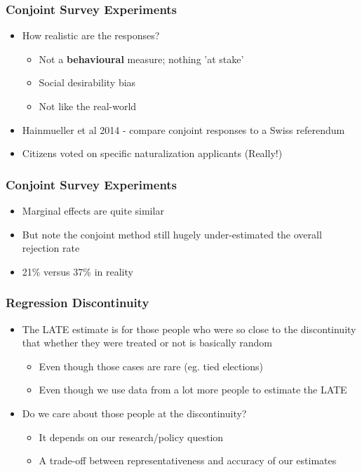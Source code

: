 \documentclass[xcolor=x11names,compress]{beamer}\usepackage[]{graphicx}\usepackage[]{color}
\renewcommand{\(}{\begin{columns}}
\renewcommand{\)}{\end{columns}}
\newcommand{\<}[1]{\begin{column}{#1}}
\renewcommand{\>}{\end{column}}
\begin{document}




\begin{frame}
\frametitle{Conjoint Survey Experiments}
\begin{itemize}
\item How realistic are the responses?
\pause
\begin{itemize}
\item Not a \textbf{behavioural} measure; nothing 'at stake'
\pause
\item Social desirability bias
\pause
\item Not like the real-world
\pause
\end{itemize}
\item Hainmueller et al 2014 - compare conjoint responses to a Swiss referendum
\pause
\item Citizens voted on specific naturalization applicants (Really!)
\end{itemize}
\end{frame}



\begin{frame}
\frametitle{Conjoint Survey Experiments}
\begin{itemize}
\item Marginal effects are quite similar
\pause
\item But note the conjoint method still hugely under-estimated the overall rejection rate
\item 21\% versus 37\% in reality
\end{itemize}
\end{frame}

\begin{frame}
\frametitle{Regression Discontinuity}
\begin{itemize}
\item The LATE estimate is for those people who were so close to the discontinuity that whether they were treated or not is basically random
\pause
\begin{itemize}
\item Even though those cases are rare (eg. tied elections)
\pause
\item Even though we use data from a lot more people to estimate the LATE
\pause
\end{itemize}
\item Do we care about those people at the discontinuity?
\pause
\begin{itemize}
\item It depends on our research/policy question
\pause
\item A trade-off between representativeness and accuracy of our estimates
\end{itemize}
\end{itemize}
\end{frame}
\end{document}
